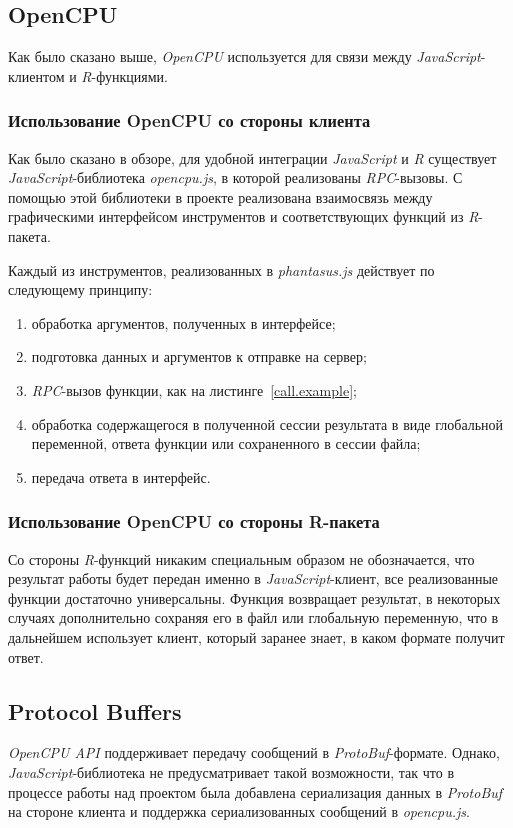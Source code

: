 \subsection{OpenCPU}
Как было сказано выше, \emph{OpenCPU} используется для связи между \emph{JavaScript}-клиентом и \emph{R}-функциями.

\subsubsection{Использование OpenCPU со стороны клиента}\label{functioncallalgo}
Как было сказано в обзоре, для удобной интеграции \emph{JavaScript} и \emph{R} существует \emph{JavaScript}-библиотека \emph{opencpu.js}, в которой реализованы \emph{RPC}-вызовы. С помощью этой библиотеки в проекте реализована взаимосвязь между графическими интерфейсом инструментов и соответствующих функций из \emph{R}-пакета.

Каждый из инструментов, реализованных в \emph{phantasus.js} действует по следующему принципу:\begin{enumerate}
\item обработка аргументов, полученных в интерфейсе;
\item подготовка данных и аргументов к отправке на сервер;
\item \emph{RPC}-вызов функции, как на листинге~\ref{call.example};
\item обработка содержащегося в полученной сессии результата в виде глобальной переменной, ответа функции или сохраненного в сессии файла;
\item передача ответа в интерфейс.
\end{enumerate}

\subsubsection{Использование OpenCPU со стороны R-пакета}
Со стороны \emph{R}-функций никаким специальным образом не обозначается, что результат работы будет передан именно в \emph{JavaScript}-клиент, все реализованные функции достаточно универсальны.
Функция возвращает результат, в некоторых случаях дополнительно сохраняя его в файл или глобальную переменную, что в дальнейшем использует клиент, который заранее знает, в каком формате получит ответ. 

\subsection{Protocol Buffers}
\emph{OpenCPU API} поддерживает передачу сообщений в \emph{ProtoBuf}-формате. Однако, \emph{JavaScript}-библиотека не предусматривает такой возможности, так что в процессе работы над проектом была добавлена сериализация данных в \emph{ProtoBuf} на стороне клиента и поддержка сериализованных сообщений в \emph{opencpu.js}. 
